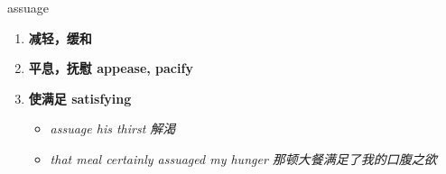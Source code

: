 
\begin{frame}
{\huge assuage}
\begin{center}
\begin{enumerate}\Large
  \item \textbf{减轻，缓和}
  \item \textbf{平息，抚慰 appease, pacify}
  \item \textbf{使满足 satisfying}
  \begin{itemize}
    \item \em{\Large{assuage his thirst 解渴}}
    \item \em{\Large{that meal certainly assuaged my hunger 那顿大餐满足了我的口腹之欲}}
  \end{itemize}
\end{enumerate}
\end{center}
\end{frame}
